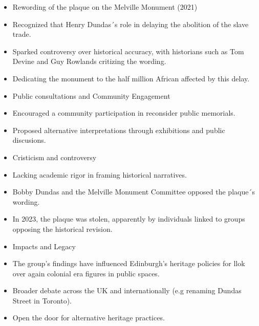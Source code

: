 \documentclass{scrartcl}
\begin{document}
        \begin{itemize}
            \item Rewording of the plaque on the Melville Monument (2021)
            \item Recognized that Henry Dundas´s role in delaying the abolition of the slave trade.  
            \item Sparked controversy over historical accuracy, with historians such as Tom Devine and Guy Rowlands critizing the wording.
        \end{itemize}
\begin{itemize}
    \item Dedicating the monument to the half million African affected by this delay.
    \item Public consultations and Community Engagement
    \item Encouraged a community participation in reconsider public memorials.
    \item Proposed alternative interpretations through exhibitions and public discusions.
    \item Cristicism and controversy
    \item Lacking academic rigor in framing historical narratives.
    \item Bobby Dundas and the Melville Monument Committee opposed the plaque´s wording.
    \item In 2023, the plaque was stolen, apparently by individuals linked to groups opposing the historical revision.
    \item Impacts and Legacy
    \item The group's findings have influenced Edinburgh's heritage policies for llok over again colonial era figures in public spaces.
    \item Broader debate across the UK  and internationally (e.g renaming Dundas Street in Toronto). 
    \item Open the door for alternative heritage practices.
\end{itemize}
\end{document}
